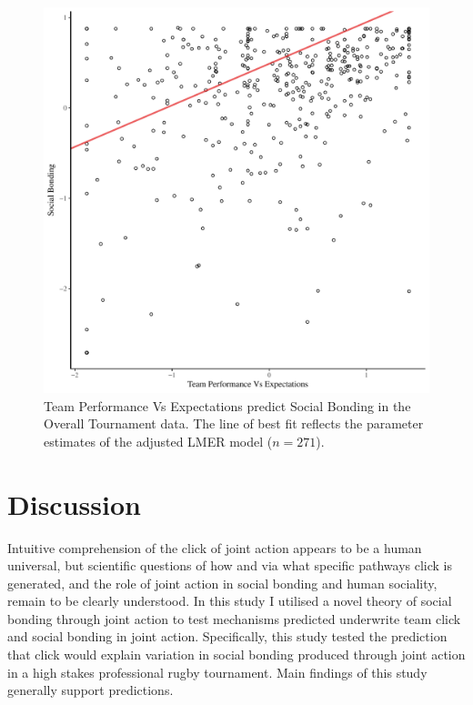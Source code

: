 \begin{CJK}{UTF8}{gbsn}
   \begin{figure}[htbp]
     \centering
   \includegraphics[scale=.5]{images/teamPerfBondOverallModelSlope.pdf}
     \caption{Team Performance Vs Expectations predict Social Bonding in the Overall Tournament data. The line of best fit reflects the parameter estimates of the adjusted LMER model ($n = 271$).}
     \label{fig:teamPerfBondOverallModelSlope}
   \end{figure}




















\clearpage

\section{Discussion}

Intuitive comprehension of the click of joint action appears to be a human universal, but scientific questions of how and via what specific pathways click is generated, and the role of joint action in social bonding and human sociality, remain to be clearly understood.  In this study I utilised a novel theory of social bonding through joint action to test mechanisms predicted underwrite team click and social bonding in joint action.  Specifically, this study tested the prediction that click would explain variation in social bonding produced through joint action in a high stakes professional rugby tournament. Main findings of this study generally support predictions.



\end{CJK}
